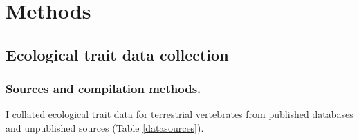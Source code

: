 \section{Methods}

\subsection{Ecological trait data collection}

\subsubsection{Sources and compilation methods.}
I collated ecological trait data for terrestrial vertebrates from published databases and unpublished sources (Table \ref{datasources}). 

